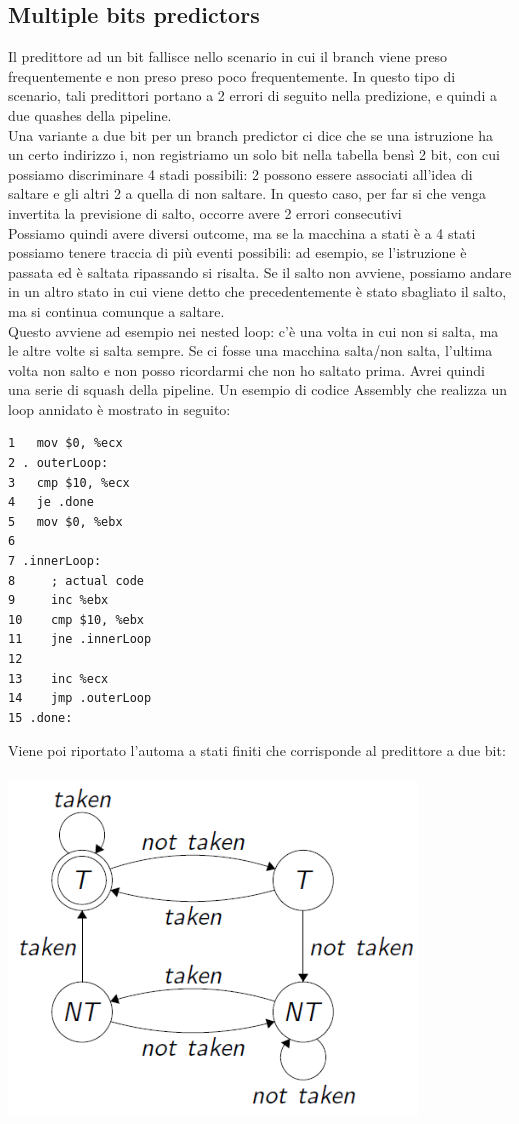 \documentclass[12pt, oneside]{extbook}
\begin{document}
\subsection{Multiple bits predictors}
Il predittore ad un bit fallisce nello scenario in cui il branch viene preso frequentemente e non preso preso poco frequentemente. In questo tipo di scenario, tali predittori portano a 2 errori di seguito nella predizione, e quindi a due quashes della pipeline.\\ 
Una variante a due bit per un branch predictor ci dice che se una istruzione ha un certo indirizzo i, non registriamo un solo bit nella tabella bensì 2 bit, con cui possiamo discriminare 4 stadi possibili: 2 possono essere associati all'idea di saltare e gli altri 2 a quella di non saltare. In questo caso, per far si che venga invertita la previsione di salto, occorre avere 2 errori consecutivi\\ Possiamo quindi avere diversi outcome, ma se la macchina a stati è a 4 stati possiamo tenere traccia di più eventi possibili: ad esempio, se l'istruzione è passata ed è saltata ripassando si risalta. Se il salto non avviene, possiamo andare in un altro stato in cui viene detto che precedentemente è stato sbagliato il salto, ma si continua comunque a saltare.\\ Questo avviene ad esempio nei nested loop: c'è una volta in cui non si salta, ma le altre volte si salta sempre. Se ci fosse una macchina salta/non salta, l'ultima volta non salto e non posso ricordarmi che non ho saltato prima. Avrei quindi una serie di squash della pipeline. Un esempio di codice Assembly che realizza un loop annidato è mostrato in seguito:
\begin{lstlisting}
1	mov $0, %ecx
2 . outerLoop:
3	cmp $10, %ecx
4	je .done
5	mov $0, %ebx
6	
7 .innerLoop:
8	  ; actual code	
9	  inc %ebx
10	  cmp $10, %ebx
11	  jne .innerLoop
12
13	  inc %ecx
14	  jmp .outerLoop
15 .done:
\end{lstlisting}
Viene poi riportato l'automa a stati finiti che corrisponde al predittore a due bit:\\\\
\includegraphics[scale=0.6]{immagini/2bit_pred}\\\\
\end{document}
